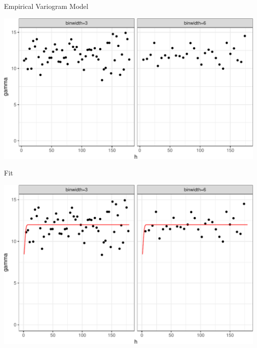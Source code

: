 \documentclass[11pt,ignorenonframetext,]{beamer}
\begin{document}
\begin{frame}{%
\protect\hypertarget{empirical-variogram-model}{%
Empirical Variogram Model}}

\begin{center}\includegraphics[width=\textwidth]{Lec13_files/figure-beamer/unnamed-chunk-23-1} \end{center}

\end{frame}

\begin{frame}{%
\protect\hypertarget{fit}{%
Fit}}

\begin{center}\includegraphics[width=\textwidth]{Lec13_files/figure-beamer/unnamed-chunk-24-1} \end{center}

\end{frame}
\end{document}
